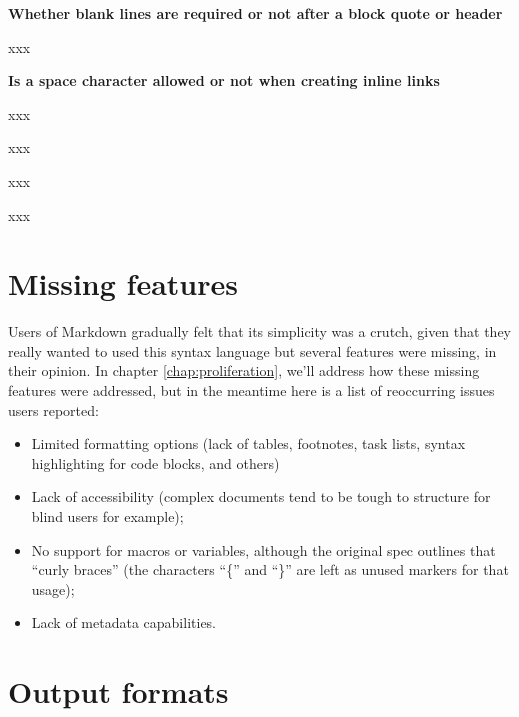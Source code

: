 \textbf{Whether blank lines are required or not after a block quote or header}\newline

xxx\newline

\textbf{Is a space character allowed or not when creating inline links}\newline

xxx\newline

\textbf{}\newline

xxx\newline

\textbf{}\newline

xxx\newline

\textbf{}\newline

xxx\newline

\newpage

\section{Missing features}

Users of Markdown gradually felt that its simplicity was a crutch, given that they really wanted to used this syntax language but several
features were missing, in their opinion. In chapter \ref{chap:proliferation}, we'll address how these missing features were addressed, but
in the meantime here is a list of reoccurring issues users reported:

\begin{itemize}
    \item Limited formatting options (lack of tables, footnotes, task lists, syntax highlighting for code blocks, and others)
    \item Lack of accessibility (complex documents tend to be tough to structure for blind users for example);
    \item No support for macros or variables, although the original spec outlines that ``curly braces'' (the characters ``\{'' and ``\}''
    are left as unused markers for that usage);
    \item Lack of metadata capabilities.
\end{itemize}

\section{Output formats}

